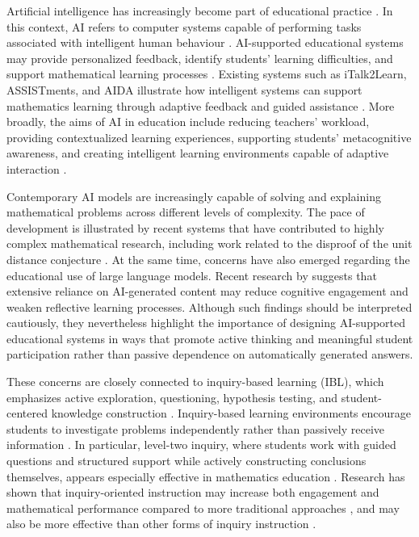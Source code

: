 \documentclass[11pt]{article}
\begin{document}
Artificial intelligence has increasingly become part of educational practice \citep{Chen2020}. In this context, AI refers to computer systems capable of performing tasks associated with intelligent human behaviour \citep{RussellNorvig2010}. AI-supported educational systems may provide personalized feedback, identify students' learning difficulties, and support mathematical learning processes \citep{HwangTu2021}. Existing systems such as iTalk2Learn, ASSISTments, and AIDA illustrate how intelligent systems can support mathematics learning through adaptive feedback and guided assistance \citep{Grawemeyer2015,Heffernan2014,Chaudhry2021}. More broadly, the aims of AI in education include reducing teachers' workload, providing contextualized learning experiences, supporting students' metacognitive awareness, and creating intelligent learning environments capable of adaptive interaction \citep{Chaudhry2021,Ma2014}.

Contemporary AI models are increasingly capable of solving and explaining mathematical problems across different levels of complexity. The pace of development is illustrated by recent systems that have contributed to highly complex mathematical research, including work related to the disproof of the unit distance conjecture \citep{Alon2026,OpenAI2026}. At the same time, concerns have also emerged regarding the educational use of large language models. Recent research by \citet{Kosmyna2025} suggests that extensive reliance on AI-generated content may reduce cognitive engagement and weaken reflective learning processes. Although such findings should be interpreted cautiously, they nevertheless highlight the importance of designing AI-supported educational systems in ways that promote active thinking and meaningful student participation rather than passive dependence on automatically generated answers.

These concerns are closely connected to inquiry-based learning (IBL), which emphasizes active exploration, questioning, hypothesis testing, and student-centered knowledge construction \citep{Gillies2020}. Inquiry-based learning environments encourage students to investigate problems independently rather than passively receive information \citep{Artigue2013,Maass2013}. In particular, level-two inquiry, where students work with guided questions and structured support while actively constructing conclusions themselves, appears especially effective in mathematics education \citep{Bruder2013}. Research has shown that inquiry-oriented instruction may increase both engagement and mathematical performance compared to more traditional approaches \citep{Freeman2014,Kogan2014,Rasmussen2007}, and may also be more effective than other forms of inquiry instruction \citep{Jiang2015}.
\end{document}
